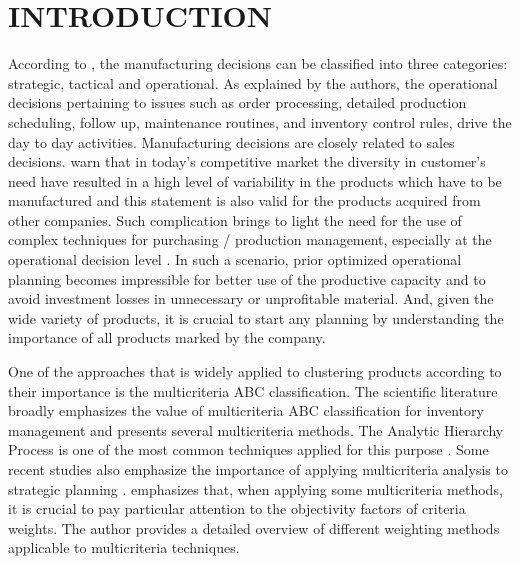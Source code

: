 \documentclass[10pt,fleqn,a4paper,twoside]{article}
\begin{document}
    \section{INTRODUCTION}
    
	According to \cite{Singhal2013}, the manufacturing decisions can be classified into three categories: strategic, tactical and operational. As explained by the authors, the operational decisions pertaining to issues such as order processing, detailed production scheduling, follow up, maintenance routines, and inventory control rules, drive the day to day activities. Manufacturing decisions are closely related to sales decisions. \cite{Ebrahimi2014} warn that in today’s competitive market the diversity in customer’s need have resulted in a high level of variability in the products which have to be manufactured and this statement is also valid for the products acquired from other companies. Such complication brings to light the need for the use of complex techniques for purchasing / production management, especially at the operational decision level \citep{Kiran2019}. In such a scenario, prior optimized operational planning becomes impressible for better use of the productive capacity and to avoid investment losses in unnecessary or unprofitable material. And, given the wide variety of products, it is crucial to start any planning by understanding the importance of all products marked by the company. 

	One of the approaches that is widely applied to clustering products according to their importance is the multicriteria ABC classification. The scientific literature broadly emphasizes the value of multicriteria ABC classification for inventory management and presents several multicriteria methods. The Analytic Hierarchy Process is one of the most common techniques applied for this purpose \citep{Flores1992, AltayGuvenir1998, Lolli2014, Balaji2014}. Some recent studies also emphasize the importance of applying multicriteria analysis to strategic planning \citep[\emph{e.g.},][]{BarbosaDePaula2022, Pereira2023, MarianoRibeiro2023}. \citet{Odu2019} emphasizes that, when applying some multicriteria methods, it is crucial to pay particular attention to the objectivity factors of criteria weights. The author provides a detailed overview of different weighting methods applicable to multicriteria techniques.
	
\end{document}
